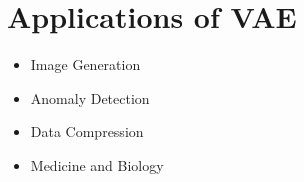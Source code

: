 \section{Applications of VAE}
\begin{itemize}
    \item Image Generation
    \item Anomaly Detection
    \item Data Compression
    \item Medicine and Biology
\end{itemize}